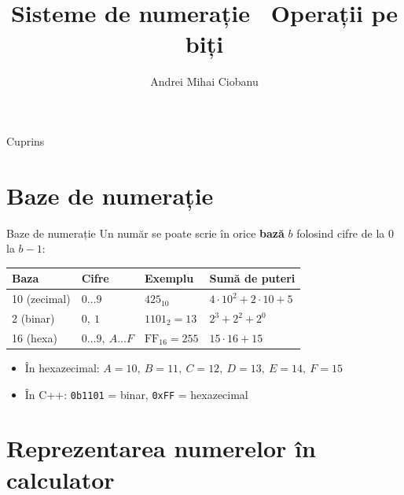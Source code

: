 ﻿\documentclass{beamer}
\title{Sisteme de numerație \textbar\ Operații pe biți}
\subtitle{}
\author{Andrei Mihai Ciobanu}
\institute{Algolymp Summer School}
\date{}
\begin{document}
\begin{frame}
  \titlepage
\end{frame}

\begin{frame}{Cuprins}
  \tableofcontents
\end{frame}

\section{Baze de numerație}

\begin{frame}{Baze de numerație}
  Un număr se poate scrie în orice \textbf{bază} $b$ folosind cifre de la $0$ la $b-1$:
  \bigskip

  \begin{tabular}{llll}
    \toprule
    Baza & Cifre & Exemplu & Sumă de puteri \\
    \midrule
    10 (zecimal) & $0 \ldots 9$             & $425_{10}$       & $4 \cdot 10^2 + 2 \cdot 10 + 5$ \\[4pt]
    2 (binar)    & $0,\ 1$                  & $1101_2 = 13$    & $2^3 + 2^2 + 2^0$ \\[4pt]
    16 (hexa)    & $0\ldots 9,\ A\ldots F$  & $\text{FF}_{16} = 255$ & $15 \cdot 16 + 15$ \\
    \bottomrule
  \end{tabular}
  \bigskip
  \begin{itemize}
    \item În hexazecimal: $A=10,\ B=11,\ C=12,\ D=13,\ E=14,\ F=15$
    \item În C++: \lstinline|0b1101| = binar, \lstinline|0xFF| = hexazecimal
  \end{itemize}
\end{frame}

\section{Reprezentarea numerelor în calculator}
\end{document}
